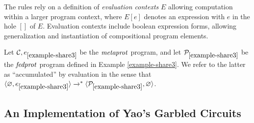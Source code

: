 The rules rely on a definition of \emph{evaluation contexts} $E$
allowing computation within a larger program context, where $E[e]$
denotes an expression with $e$ in the hole $[]$ of $E$. Evaluation
contexts include boolean expression forms, allowing generalization
and instantiation of compositional program elements.
\begin{example}
  \label{example-share3-eval}
  Let $\mathcal{C},e_{\ref{example-share3}}$ be the $\mathit{metaprot}$ program, and let 
  $\mathcal{P}_{\ref{example-share3}}$ be the  $\mathit{fedprot}$ program defined
  in Example \ref{example-share3}. We refer to the latter as ``accumulated''
  by evaluation in the sense that $\langle \varnothing,e_{\ref{example-share3}} \rangle
  \xrightarrow{}^{*} \langle \mathcal{P}_{\ref{example-share3}},\varnothing \rangle$.
\end{example}

\subsection{An Implementation of Yao's Garbled Circuits}
\label{section-metalang-ygc}






